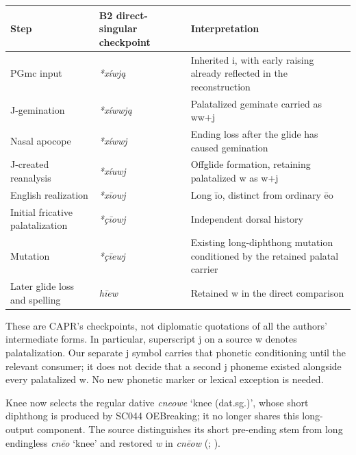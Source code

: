 \documentclass[
  british,
  a4paper,
]{article}
\newcounter{none} %
\begin{document}
{\def\LTcaptype{none} %
\begin{longtable}[]{@{}
  >{\raggedright\arraybackslash}p{}
  >{\raggedright\arraybackslash}p{}
  >{\raggedright\arraybackslash}p{}@{}}
\toprule\noalign{}
\begin{minipage}[b]{\linewidth}\raggedright
Step
\end{minipage} & \begin{minipage}[b]{\linewidth}\raggedright
B2 direct-singular checkpoint
\end{minipage} & \begin{minipage}[b]{\linewidth}\raggedright
Interpretation
\end{minipage} \\
\midrule\noalign{}
\endhead
\bottomrule\noalign{}
\endlastfoot
PGmc input & \emph{*xíwją} & Inherited i, with early raising already
reflected in the reconstruction \\
J-gemination & \emph{*xíwwją} & Palatalized geminate carried as ww+j \\
Nasal apocope & \emph{*xíwwj} & Ending loss after the glide has caused
gemination \\
J-created reanalysis & \emph{*xíuwj} & Offglide formation, retaining
palatalized w as w+j \\
English realization & \emph{*xīowj} & Long īo, distinct from ordinary
ēo \\
Initial fricative palatalization & \emph{*çīowj} & Independent dorsal
history \\
Mutation & \emph{*çīewj} & Existing long-diphthong mutation conditioned
by the retained palatal carrier \\
Later glide loss and spelling & \emph{hīew} & Retained w in the direct
comparison \\
\end{longtable}
}

These are CAPR's checkpoints, not diplomatic quotations of all the
authors' intermediate forms. In particular, superscript j on a source w
denotes palatalization. Our separate j symbol carries that phonetic
conditioning until the relevant consumer; it does not decide that a
second j phoneme existed alongside every palatalized w. No new phonetic
marker or lexical exception is needed.

Knee now selects the regular dative \emph{cneowe} `knee (dat.sg.)',
whose short diphthong is produced by SC044 OEBreaking; it no longer
shares this long-output component. The source distinguishes its short
pre-ending stem from long endingless \emph{cnēo} `knee' and restored
\emph{w} in \emph{cnēow} (; ).
\end{document}
